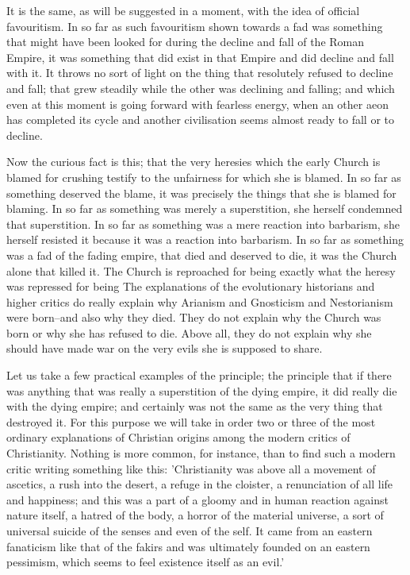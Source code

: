 It is the same, as will be suggested in a moment, with the idea of official favouritism. In so far as such favouritism shown towards a fad was something that might have been looked for during the decline and fall of the Roman Empire, it was something that did exist in that Empire and did decline and fall with it. It throws no sort of light on the thing that resolutely refused to decline and fall; that grew steadily while the other was declining and falling; and which even at this moment is going forward with fearless energy, when an other aeon has completed its cycle and another civilisation seems almost ready to fall or to decline.

Now the curious fact is this; that the very heresies which the early Church is blamed for crushing testify to the unfairness for which she is blamed. In so far as something deserved the blame, it was precisely the things that she is blamed for blaming. In so far as something was merely a superstition, she herself condemned that superstition. In so far as something was a mere reaction into barbarism, she herself resisted it because it was a reaction into barbarism. In so far as something was a fad of the fading empire, that died and deserved to die, it was the Church alone that killed it. The Church is reproached for being exactly what the heresy was repressed for being The explanations of the evolutionary historians and higher critics do really explain why Arianism and Gnosticism and Nestorianism were born--and also why they died. They do not explain why the Church was born or why she has refused to die. Above all, they do not explain why she should have made war on the very evils she is supposed to share.

Let us take a few practical examples of the principle; the principle that if there was anything that was really a superstition of the dying empire, it did really die with the dying empire; and certainly was not the same as the very thing that destroyed it. For this purpose we will take in order two or three of the most ordinary explanations of Christian origins among the modern critics of Christianity. Nothing is more common, for instance, than to find such a modern critic writing something like this: 'Christianity was above all a movement of ascetics, a rush into the desert, a refuge in the cloister, a renunciation of all life and happiness; and this was a part of a gloomy and in human reaction against nature itself, a hatred of the body, a horror of the material universe, a sort of universal suicide of the senses and even of the self. It came from an eastern fanaticism like that of the fakirs and was ultimately founded on an eastern pessimism, which seems to feel existence itself as an evil.'

